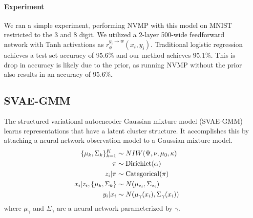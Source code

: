 \paragraph{Experiment} We ran a simple experiment, performing
NVMP with this model on MNIST restricted to the 3 and 8 digit.
We utilized a 2-layer 500-wide feedforward network with Tanh activations
as $r_{\phi}^{y_i \rightarrow w}(x_i, y_i)$.
Traditional logistic regression achieves a test set accuracy of 95.6\%
and our method achieves 95.1\%. This is drop in accuracy is likely due to the
prior, as running NVMP without the prior
also results in an accuracy of 95.6\%.

\subsection{SVAE-GMM}
The structured variational autoencoder Gaussian mixture model (SVAE-GMM) \cite{svae} learns representations
that have a latent cluster structure.
It accomplishes this by attaching a neural network observation model
to a Gaussian mixture model.
\begin{align*}
    \{\mu_k, \Sigma_k\}_{k = 1}^K &\sim NIW(\Psi, \nu, \mu_0, \kappa) \\
    \pi &\sim \text{Dirichlet}(\alpha) \\
    z_i | \pi &\sim \text{Categorical}(\pi) \\
    x_i | z_i, \{\mu_k, \Sigma_k\} &\sim N(\mu_{z_i}, \Sigma_{z_i}) \\
    y_i | x_i &\sim N(\mu_\gamma(x_i), \Sigma_\gamma(x_i))
\end{align*}
where $\mu_\gamma$ and $\Sigma_\gamma$ are a neural network parameterized by $\gamma$.


